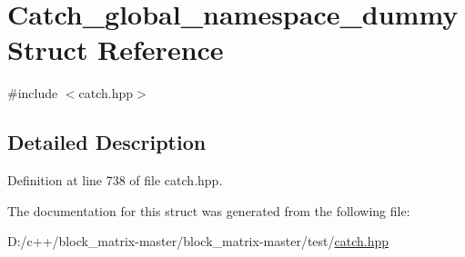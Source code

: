 \hypertarget{struct_catch__global__namespace__dummy}{}\section{Catch\+\_\+global\+\_\+namespace\+\_\+dummy Struct Reference}
\label{struct_catch__global__namespace__dummy}


{\ttfamily \#include $<$catch.\+hpp$>$}



\subsection{Detailed Description}


Definition at line 738 of file catch.\+hpp.



The documentation for this struct was generated from the following file\+:\begin{DoxyCompactItemize}
\item 
D\+:/c++/block\+\_\+matrix-\/master/block\+\_\+matrix-\/master/test/\mbox{\hyperlink{catch_8hpp}{catch.\+hpp}}\end{DoxyCompactItemize}
